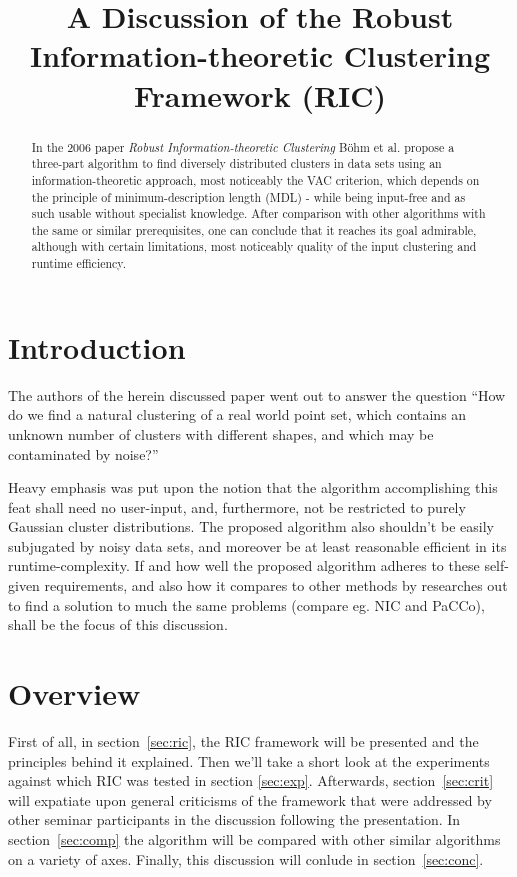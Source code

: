 \documentclass[conference]{IEEEtran}
\begin{document}
\title{A Discussion of the Robust Information-theoretic Clustering Framework (RIC)}
\author{
}

\maketitle

\begin{abstract}
In the 2006 paper \textit{Robust Information-theoretic Clustering} Böhm et al. propose a three-part algorithm to find diversely distributed clusters in data sets using an information-theoretic approach, most noticeably the VAC criterion, which depends on the principle of minimum-description length (MDL) - while being input-free and as such usable without specialist knowledge. After comparison with other algorithms with the same or similar prerequisites, one can conclude that it reaches its goal admirable, although with certain limitations, most noticeably quality of the input clustering and runtime efficiency.
\end{abstract}

\section{Introduction}
The authors of the herein discussed paper\cite{Bohm2006-ts} went out to answer the question “How do we find a natural clustering of a real world point set, which contains an unknown number of clusters with different shapes, and which may be contaminated by noise?”

Heavy emphasis was put upon the notion that the algorithm accomplishing this feat shall need no user-input, and, furthermore, not be restricted to purely Gaussian cluster distributions. The proposed algorithm also shouldn't be easily subjugated by noisy data sets, and moreover be at least reasonable efficient in its runtime-complexity. If and how well the proposed algorithm adheres to these self-given requirements, and also how it compares to other methods by researches out to find a solution to much the same problems (compare eg. NIC\cite{Faivishevsky2010-uk} and PaCCo\cite{Mueller2011-hd}), shall be the focus of this discussion.

\section{Overview}
First of all, in section~\ref{sec:ric}, the RIC framework will be presented and the principles behind it explained. Then we'll take a short look at the experiments against which RIC was tested in section \ref{sec:exp}. Afterwards, section~\ref{sec:crit} will expatiate upon general criticisms of the framework that were addressed by other seminar participants in the discussion following the presentation. In section~\ref{sec:comp} the algorithm will be compared with other similar algorithms on a variety of axes. Finally, this discussion will conlude in section~\ref{sec:conc}.
\end{document}
